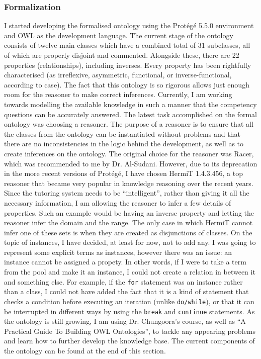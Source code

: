 \documentclass[titlepage]{article}
\begin{document}
\subsubsection{Formalization}
I started developing the formalised ontology using the Prot\'eg\'e 5.5.0 environment and OWL as the development language.
\newline
The current stage of the ontology consists of twelve main classes which have a combined total of 31 subclasses, all of which are properly disjoint and commented.
\newline
Alongside these, there are 22 properties (relationships), including inverses. Every property has been rightfully characterised (as irreflexive, asymmetric, functional, or inverse-functional, according to case). The fact that this ontology is so rigorous allows just enough room for the reasoner to make correct inferences. Currently, I am working towards modelling the available knowledge in such a manner that the competency questions can be accurately answered.
\newline
The latest task accomplished on the formal ontology was choosing a reasoner. The purpose of a reasoner is to ensure that all the classes from the ontology can be instantiated without problems and that there are no inconsistencies in the logic behind the development, as well as to create inferences on the ontology.
\newline
The original choice for the reasoner was Racer\cite{racerhome}, which was recommended to me by Dr. Al-Sudani. However, due to its deprecation in the more recent versions of Prot\'eg\'e, I have chosen HermiT 1.4.3.456, a top reasoner that became very popular in knowledge reasoning over the recent years\cite{hermithome}.
\newline
Since the tutoring system needs to be ``intelligent'', rather than giving it all the necessary information, I am allowing the reasoner to infer a few details of properties. Such an example would be having an inverse property and letting the reasoner infer the domain and the range. The only case in which HermiT cannot infer one of these sets is when they are created as disjunctions of classes.
\newline
On the topic of instances, I have decided, at least for now, not to add any. I was going to represent some explicit terms as instances, however there was an issue: an instance cannot be assigned a propety. In other words, if I were to take a term from the pool and make it an instance, I could not create a relation in between it and something else. For example, if the \texttt{for} statement was an instance rather than a class, I could not have added the fact that it is a kind of statement that checks a condition before executing an iteration (unlike \texttt{do/while}), or that it can be interrupted in different ways by using the \texttt{break} and \texttt{continue} statements.
\newline
As the ontology is still growing, I am using Dr. Chungoora's course, as well as ``A Practical Guide To Building OWL Ontologies''\cite{owlprotg}, to tackle any appearing problems and learn how to further develop the knowledge base. The current components of the ontology can be found at the end of this section.
\end{document}
